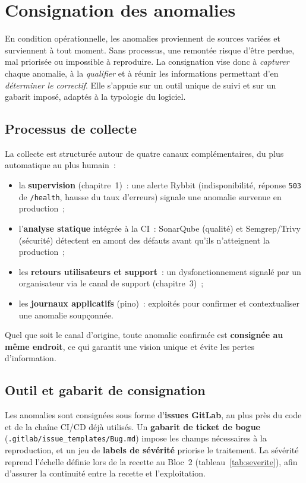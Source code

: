\section{Consignation des anomalies}
\label{sec:consignation}

En condition opérationnelle, les anomalies proviennent de sources variées et surviennent à tout moment. Sans processus, une remontée risque d'être perdue, mal priorisée ou impossible à reproduire. La consignation vise donc à \emph{capturer} chaque anomalie, à la \emph{qualifier} et à réunir les informations permettant d'en \emph{déterminer le correctif}. Elle s'appuie sur un outil unique de suivi et sur un gabarit imposé, adaptés à la typologie du logiciel.

\subsection{Processus de collecte}
La collecte est structurée autour de quatre canaux complémentaires, du plus automatique au plus humain~:
\begin{itemize}
    \item la \textbf{supervision} (chapitre~1)~: une alerte Rybbit (indisponibilité, réponse \texttt{503} de \texttt{/health}, hausse du taux d'erreurs) signale une anomalie survenue en production~;
    \item l'\textbf{analyse statique} intégrée à la CI~: SonarQube (qualité) et Semgrep/Trivy (sécurité) détectent en amont des défauts avant qu'ils n'atteignent la production~;
    \item les \textbf{retours utilisateurs et support}~: un dysfonctionnement signalé par un organisateur via le canal de support (chapitre~3)~;
    \item les \textbf{journaux applicatifs} (pino)~: exploités pour confirmer et contextualiser une anomalie soupçonnée.
\end{itemize}
Quel que soit le canal d'origine, toute anomalie confirmée est \textbf{consignée au même endroit}, ce qui garantit une vision unique et évite les pertes d'information.

\subsection{Outil et gabarit de consignation}
Les anomalies sont consignées sous forme d'\textbf{issues GitLab}, au plus près du code et de la chaîne CI/CD déjà utilisés. Un \textbf{gabarit de ticket de bogue} (\texttt{.gitlab/issue\_templates/Bug.md}) impose les champs nécessaires à la reproduction, et un jeu de \textbf{labels de sévérité} priorise le traitement. La sévérité reprend l'échelle définie lors de la recette au Bloc~2 (tableau~\ref{tab:severite}), afin d'assurer la continuité entre la recette et l'exploitation.


